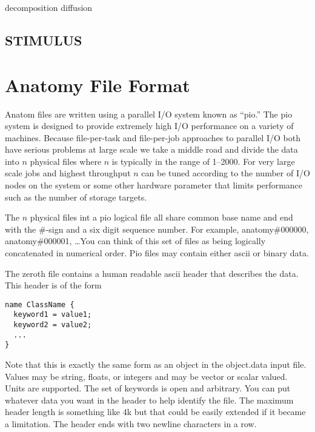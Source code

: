 \documentclass{article}
\begin{document}
\begin{keywords}
  {decomposition}
  {diffusion}
\end{keywords}

\subsection{STIMULUS}

\section{Anatomy File Format}

Anatom files are written using a parallel I/O system known as ``pio.''
The pio system is designed to provide extremely high I/O performance on
a variety of machines.  Because file-per-task and file-per-job
approaches to parallel I/O both have serious problems at large scale we
take a middle road and divide the data into $n$ physical files where $n$
is typically in the range of 1--2000.  For very large scale jobs and
highest throughput $n$ can be tuned according to the number of I/O nodes
on the system or some other hardware parameter that limits performance
such as the number of storage targets.


The $n$ physical files int a pio logical file all share common base name
and end with the \#-sign and a six digit sequence number.  For example,
anatomy\#000000, anatomy\#000001, \ldots You can think of this set of
files as being logically concatenated in numerical order.  Pio files may
contain either ascii or binary data.

The zeroth file contains a human readable ascii header that describes
the data.  This header is of the form
\begin{verbatim}
name ClassName { 
  keyword1 = value1; 
  keyword2 = value2;
  ...
}
\end{verbatim}
Note that this is exactly the same form as an object in the object.data
input file.  Values may be string, floats, or integers and may be vector
or scalar valued.  Units are supported.  The set of keywords is open and
arbitrary.  You can put whatever data you want in the header to help
identify the file.  The maximum header length is something like 4k but
that could be easily extended if it became a limitation.  The header
ends with two newline characters in a row.
\end{document}
